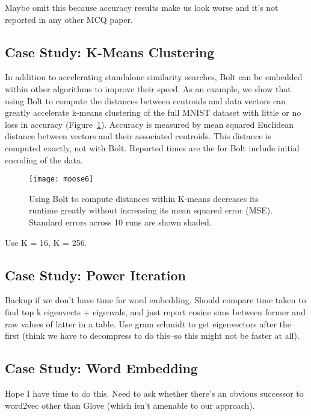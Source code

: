 Maybe omit this because accuracy results make us look worse and it's not reported in any other MCQ paper.


\subsection{Case Study: K-Means Clustering}

In addition to accelerating standalone similarity searches, Bolt can be embedded within other algorithms to improve their speed. As an example, we show that using Bolt to compute the distances between centroids and data vectors can greatly accelerate k-means clustering of the full MNIST dataset with little or no loss in accuracy (Figure~\ref{fig:kmeans}). Accuracy is measured by mean squared Euclidean distance between vectors and their associated centroids. This distance is computed exactly, not with Bolt. Reported times are the for Bolt include initial encoding of the data.

\begin{figure}[h]
\begin{center}
\label{fig:kmeans}
\texttt{[image: moose6]}
\vspace*{-1mm}
\caption{Using Bolt to compute distances within K-means decreases its runtime greatly without increasing its mean squared error (MSE). Standard errors across 10 runs are shown shaded.}
\end{center}
\end{figure}

Use K = 16, K = 256.

\subsection{Case Study: Power Iteration}

Backup if we don't have time for word embedding. Should compare time taken to find top k eigenvects + eigenvals, and just report cosine sims between former and raw values of latter in a table. Use gram schmidt to get eigenvectors after the first (think we have to decompress to do this--so this might not be faster at all).

\subsection{Case Study: Word Embedding}

Hope I have time to do this. Need to ask whether there's an obvious successor to word2vec other than Glove (which isn't amenable to our approach).




